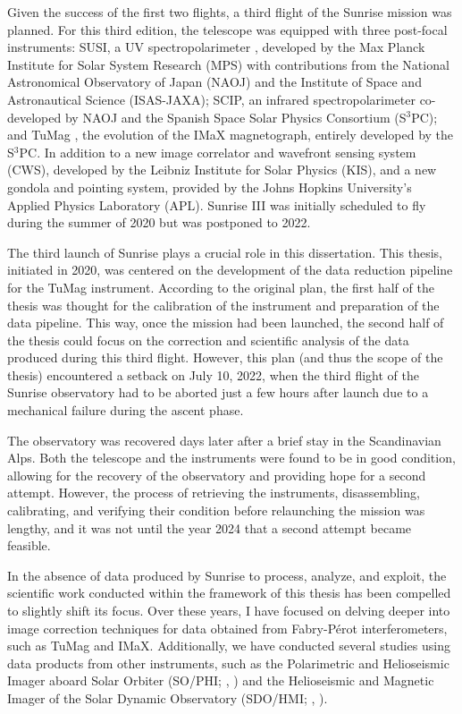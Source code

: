Given the success of the first two flights, a third flight of the Sunrise mission was planned. For this third edition, the telescope was equipped with three post-focal instruments: SUSI, a UV spectropolarimeter \citep{susi}, developed by the Max Planck Institute for Solar System Research (MPS) with contributions from the National Astronomical Observatory of Japan (NAOJ) and the Institute of Space and Astronautical Science (ISAS-JAXA); SCIP, an infrared spectropolarimeter \citep{SCIP} co-developed by NAOJ and the Spanish Space Solar Physics Consortium (S$^3$PC); and TuMag \citep{tumag}, the evolution of the IMaX magnetograph, entirely developed by the S$^3$PC. In addition to a new image correlator and wavefront sensing system (CWS), developed by the Leibniz Institute for Solar Physics (KIS), and a new gondola and pointing system, provided by the Johns Hopkins University's Applied Physics Laboratory (APL). Sunrise III was initially scheduled to fly during the summer of 2020 but was postponed to 2022.

The third launch of Sunrise plays a crucial role in this dissertation. This thesis, initiated in 2020, was centered on the development of the data reduction pipeline for the TuMag instrument. According to the original plan, the first half of the thesis was thought for the calibration of the instrument and preparation of the data pipeline. This way, once the mission had been launched, the second half of the thesis could focus on the correction and scientific analysis of the data produced during this third flight. However, this plan (and thus the scope of the thesis) encountered a setback on July 10, 2022, when the third flight of the Sunrise observatory had to be aborted just a few hours after launch due to a mechanical failure during the ascent phase.

The observatory was recovered days later after a brief stay in the Scandinavian Alps. Both the telescope and the instruments were found to be in good condition, allowing for the recovery of the observatory and providing hope for a second attempt. However, the process of retrieving the instruments, disassembling, calibrating, and verifying their condition before relaunching the mission was lengthy, and it was not until the year 2024 that a second attempt became feasible.

In the absence of data produced by Sunrise to process, analyze, and exploit, the scientific work conducted within the framework of this thesis has been compelled to slightly shift its focus. Over these years, I have focused on delving deeper into image correction techniques for data obtained from Fabry-Pérot interferometers, such as TuMag and IMaX. Additionally, we have conducted several studies using data products from other instruments, such as the Polarimetric and Helioseismic Imager aboard Solar Orbiter (SO/PHI; \citealt{PHI}, \citealt{SO}) and the Helioseismic and Magnetic Imager of the Solar Dynamic Observatory (SDO/HMI; \citealt{hmi1}, \citealt{SDO}).

